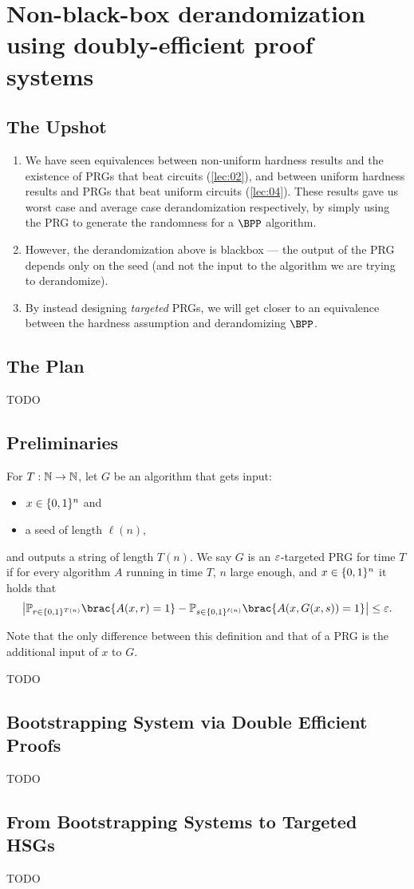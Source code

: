 \chapter{Non-black-box derandomization using doubly-efficient proof systems}\label{lec:10}

\section*{The Upshot}

\begin{enumerate}
  \item We have seen equivalences between non-uniform hardness results and the
    existence of PRGs that beat circuits (\cref{lec:02}), and between uniform
    hardness results and PRGs that beat uniform circuits (\cref{lec:04}).
    These results gave us worst case and average case derandomization
    respectively, by simply using the PRG to generate the randomness for a
    $\BPP$ algorithm.
  \item However, the derandomization above is blackbox --- the output of the
    PRG depends only on the seed (and not the input to the algorithm we are
    trying to derandomize).
  \item By instead designing \emph{targeted} PRGs, we will get closer to an
    equivalence between the hardness assumption and derandomizing $\BPP$.
\end{enumerate}

\section{The Plan}
TODO

\section{Preliminaries}

\begin{definition}%
  \label{defn:targeted-PRG}
  For $T : \mathbb{N} \to \mathbb{N}$, let $G$ be an algorithm that gets input:
  \begin{itemize}
    \item $x \in \{0, 1\}^n$ and
    \item a seed of length $\ell(n)$,
  \end{itemize}
  and outputs a string of length $T(n)$.
  We say $G$ is an $\varepsilon$-targeted PRG for time $T$ if for every algorithm
  $A$ running in time $T$, $n$ large enough, and $x \in \{0, 1\}^n$ it holds
  that
  \[
    \card*{ \Pr_{r \in \set{0, 1}^{T(n)}} \brac{ A(x, r) = 1 } -
    \Pr_{s \in \set{0, 1}^{\ell(n)}} \brac{ A(x, G(x, s)) = 1 }} \leq \eps.
  \]
\end{definition}
Note that the only difference between this definition and that of a PRG is
the additional input of $x$ to $G$.

TODO

\section{Bootstrapping System via Double Efficient Proofs}
TODO

\section{From Bootstrapping Systems to Targeted HSGs}
TODO